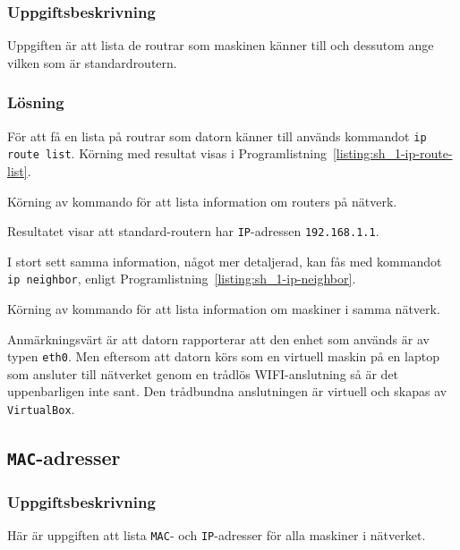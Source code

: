 \subsubsection{Uppgiftsbeskrivning}
Uppgiften är att lista de routrar som maskinen känner till och dessutom ange
vilken som är standardroutern.


\subsubsection{Lösning}
För att få en lista på routrar som datorn känner till används kommandot
\texttt{ip route list}.  Körning med resultat visas i
Programlistning~\ref{listing:sh_1-ip-route-list}.

\begin{listing}[H]
  \caption{Körning av kommando för att lista information om routers på
           nätverk.}
  \label{listing:sh_1-ip-route-list}
\end{listing}


Resultatet visar att standard-routern har \texttt{IP}-adressen
\texttt{192.168.1.1}.


I stort sett samma information, något mer detaljerad, kan fås med kommandot
\texttt{ip neighbor}, enligt Programlistning~\ref{listing:sh_1-ip-neighbor}.

\begin{listing}[H]
  \caption{Körning av kommando för att lista information om maskiner i samma
           nätverk.}
  \label{listing:sh_1-ip-neighbor}
\end{listing}

Anmärkningsvärt är att datorn rapporterar att den enhet som används är av typen
\texttt{eth0}.  Men eftersom att datorn körs som en virtuell maskin på en
laptop som ansluter till nätverket genom en trådlös WIFI-anslutning så är det
uppenbarligen inte sant.  Den trådbundna anslutningen är virtuell och skapas av
\texttt{VirtualBox}.


\subsection{\texttt{MAC}-adresser}
\subsubsection{Uppgiftsbeskrivning}
Här är uppgiften att lista \texttt{MAC}- och \texttt{IP}-adresser för alla
maskiner i nätverket.


